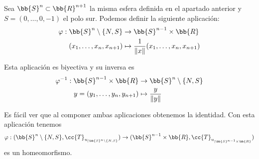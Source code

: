 \begin{ejemplo}
\begin{itemize}
        
        
        Sea $\bb{S}^n \subset \bb{R}^{n+1}$ la misma esfera definida en el apartado anterior y $S=(0,\dots, 0,-1)$ el polo sur. Podemos definir la siguiente aplicación:
        \begin{align*}
            \varphi : \bb{S}^n\setminus \{N, S\} &\to \bb{S}^{n-1}\times \bb{R}\\
            (x_1, \dots, x_n, x_{n+1}) &\mapsto \frac{1}{\|x\|} (x_1, \dots, x_n, x_{n+1})
        \end{align*}

        Esta aplicación es biyectiva y su inversa es
        \begin{align*}
            \varphi^{-1} : \bb{S}^{n-1}\times \bb{R} &\to \bb{S}^n \setminus \{N,S\}\\
            y=(y_1, \dots, y_n, y_{n+1}) &\mapsto \frac{y}{\|y\|}
        \end{align*}

        Es fácil ver que al componer ambas aplicaciones obtenemos la identidad. Con esta aplicación tenemos
        \begin{gather*}
            \varphi : (\bb{S}^n\setminus \{N,S\}, \cc{T}_{u_{|\bb{S}^n\setminus \{N,S\}}}) \to (\bb{S}^{n-1}\times \bb{R}, \cc{T}_{u_{|\bb{S}^{n-1}\times \bb{R}}})
        \end{gather*}
        es un homeomorfismo.
    \end{itemize}
    \endsquare
\end{ejemplo}

